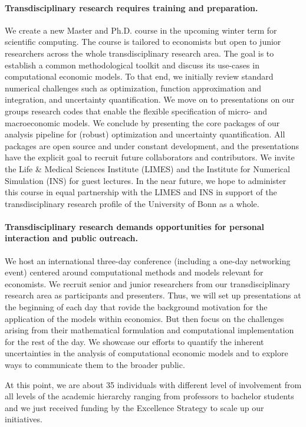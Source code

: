\paragraph{Transdisciplinary research requires training and preparation.} We create a new Master and Ph.D. course in the upcoming winter term for scientific computing. The course is tailored to economists but open to junior researchers across the whole transdisciplinary research area. The goal is to establish a common methodological toolkit and discuss its use-cases in computational economic models. To that end, we initially review standard numerical challenges such as optimization, function approximation and integration, and uncertainty quantification. We move on to presentations on our groups research codes that enable the flexible specification of micro- and macroeconomic models. We conclude by presenting the core packages of our analysis pipeline for (robust) optimization and uncertainty quantification. All packages are open source and under constant development, and the presentations have the explicit goal to recruit future collaborators and contributors. We invite the Life \& Medical Sciences Institute (LIMES) and the Institute for Numerical Simulation (INS) for guest lectures. In the near future, we hope to administer this course in equal partnership with the LIMES and INS in support of the transdisciplinary research profile of the University of Bonn as a whole.

\paragraph{Transdisciplinary research demands opportunities for personal interaction and public outreach.} We host an international three-day conference (including a one-day networking event) centered around computational methods and models relevant for economists. We recruit senior and junior researchers from our transdisciplinary research area as participants and presenters. Thus, we will set up presentations at the beginning of each day that rovide the background motivation for the application of the models within economics. But then focus on the challenges arising from their mathematical formulation and computational implementation for the rest of the day. We showcase our efforts to quantify the inherent uncertainties in the analysis of computational economic models and to explore ways to communicate them to the broader public.

\noindent At this point, we are about 35 individuals with different level of involvement from all levels of the academic hierarchy ranging from professors to bachelor students and we just received funding by the Excellence Strategy to scale up our initiatives.\\
